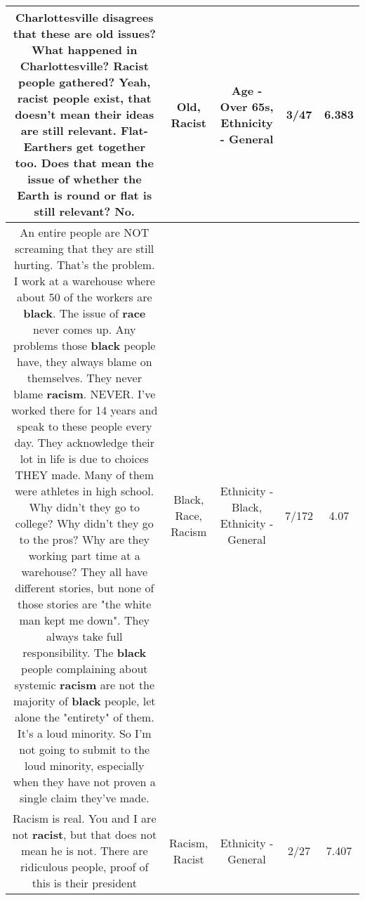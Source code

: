 \documentclass[11pt]{article}
\newlength\mylength
\begin{document}
\begin{center}
\begin{longtable}{|C{.65\mylength}|C{.30\mylength}|C{.12\mylength}|C{.12\mylength}|C{.12\mylength}|}
  \small Charlottesville disagrees that these are \textbf{old} issues? What happened in Charlottesville? \textbf{Racist} people gathered? Yeah, \textbf{racist} people exist, that doesn't mean their ideas are still relevant. Flat-Earthers get together too. Does that mean the issue of whether the Earth is round or flat is still relevant? No.\normalsize   & Old, Racist & Age - Over 65s, Ethnicity - General & 3/47 & 6.383 \\  \hline
  \small An entire people are NOT screaming that they are still hurting. That's the problem. I work at a warehouse where about 50 of the workers are \textbf{black}. The issue of \textbf{race} never comes up. Any problems those \textbf{black} people have, they always blame on themselves. They never blame \textbf{racism}. NEVER. I've worked there for 14 years and speak to these people every day. They acknowledge their lot in life is due to choices THEY made. Many of them were athletes in high school. Why didn't they go to college? Why didn't they go to the pros? Why are they working part time at a warehouse? They all have different stories, but none of those stories are "the white man kept me down". They always take full responsibility. The \textbf{black} people complaining about systemic \textbf{racism} are not the majority of \textbf{black} people, let alone the "entirety" of them. It's a loud minority. So I'm not going to submit to the loud minority, especially when they have not proven a single claim they've made.\normalsize   & Black, Race, Racism & Ethnicity - Black, Ethnicity - General & 7/172 & 4.07 \\  \hline
  \small Racism is real. You and I are not \textbf{racist}, but that does not mean he is not. There are ridiculous people, proof of this is their president\normalsize   & Racism, Racist & Ethnicity - General & 2/27 & 7.407 \\  \hline

\end{longtable}
\end{center}
\end{document}
